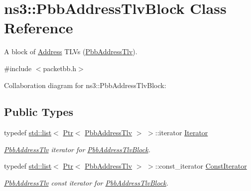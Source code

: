 \hypertarget{classns3_1_1PbbAddressTlvBlock}{}\section{ns3\+:\+:Pbb\+Address\+Tlv\+Block Class Reference}
\label{classns3_1_1PbbAddressTlvBlock}


A block of \hyperlink{classns3_1_1Address}{Address} T\+L\+Vs (\hyperlink{classns3_1_1PbbAddressTlv}{Pbb\+Address\+Tlv}).  




{\ttfamily \#include $<$packetbb.\+h$>$}



Collaboration diagram for ns3\+:\+:Pbb\+Address\+Tlv\+Block\+:
\subsection*{Public Types}
\begin{DoxyCompactItemize}
\item 
typedef \hyperlink{openflow-interface_8h_afd9bcfa176617760671b67580f536fa7}{std\+::list}$<$ \hyperlink{classns3_1_1Ptr}{Ptr}$<$ \hyperlink{classns3_1_1PbbAddressTlv}{Pbb\+Address\+Tlv} $>$ $>$\+::iterator \hyperlink{classns3_1_1PbbAddressTlvBlock_a3291c01bdaccabd163f5b65b64c981da}{Iterator}
\begin{DoxyCompactList}\small\item\em \hyperlink{classns3_1_1PbbAddressTlv}{Pbb\+Address\+Tlv} iterator for \hyperlink{classns3_1_1PbbAddressTlvBlock}{Pbb\+Address\+Tlv\+Block}. \end{DoxyCompactList}\item 
typedef \hyperlink{openflow-interface_8h_afd9bcfa176617760671b67580f536fa7}{std\+::list}$<$ \hyperlink{classns3_1_1Ptr}{Ptr}$<$ \hyperlink{classns3_1_1PbbAddressTlv}{Pbb\+Address\+Tlv} $>$ $>$\+::const\+\_\+iterator \hyperlink{classns3_1_1PbbAddressTlvBlock_a48fa2760ff5fae1a550680b0ace7403b}{Const\+Iterator}
\begin{DoxyCompactList}\small\item\em \hyperlink{classns3_1_1PbbAddressTlv}{Pbb\+Address\+Tlv} const iterator for \hyperlink{classns3_1_1PbbAddressTlvBlock}{Pbb\+Address\+Tlv\+Block}. \end{DoxyCompactList}\end{DoxyCompactItemize}
